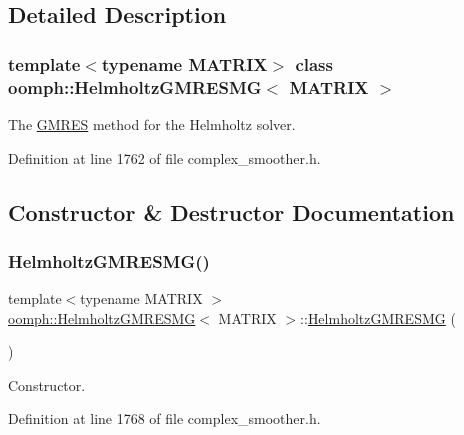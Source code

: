 \subsection{Detailed Description}
\subsubsection*{template$<$typename M\+A\+T\+R\+IX$>$\newline
class oomph\+::\+Helmholtz\+G\+M\+R\+E\+S\+M\+G$<$ M\+A\+T\+R\+I\+X $>$}

The \hyperlink{classoomph_1_1GMRES}{G\+M\+R\+ES} method for the Helmholtz solver. 

Definition at line 1762 of file complex\+\_\+smoother.\+h.



\subsection{Constructor \& Destructor Documentation}
\mbox{\label{classoomph_1_1HelmholtzGMRESMG_ab686680821fe3c9ac0c0a07ccb0e7550}} 
\subsubsection{\texorpdfstring{Helmholtz\+G\+M\+R\+E\+S\+M\+G()}{HelmholtzGMRESMG()}\hspace{0.1cm}{\footnotesize\ttfamily [1/2]}}
{\footnotesize\ttfamily template$<$typename M\+A\+T\+R\+IX $>$ \\
\hyperlink{classoomph_1_1HelmholtzGMRESMG}{oomph\+::\+Helmholtz\+G\+M\+R\+E\+S\+MG}$<$ M\+A\+T\+R\+IX $>$\+::\hyperlink{classoomph_1_1HelmholtzGMRESMG}{Helmholtz\+G\+M\+R\+E\+S\+MG} (\begin{DoxyParamCaption}{ }\end{DoxyParamCaption})\hspace{0.3cm}{\ttfamily [inline]}}



Constructor. 



Definition at line 1768 of file complex\+\_\+smoother.\+h.

